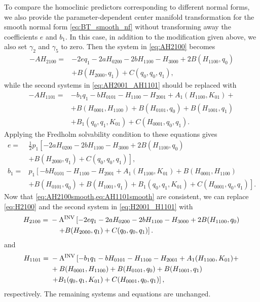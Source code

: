 To compare the homoclinic predictors corresponding to different normal forms, we also
provide the parameter-dependent center manifold transformation for the smooth
normal form \cref{eq:BT_smooth_nf} without transforming away the coefficients
$e$ and $b_1$. In this case, in addition to the modification given above, we also set
$\gamma_2$ and $\gamma_5$ to zero. Then the system in \cref{eq:AH2100} becomes
\begin{equation}
\label{eq:AH2100smooth}
\begin{aligned}
-A H_{2100} ={}& - 2 e q_1 -2 a H_{0200}-2 b H_{1100}-H_{3000} + 2 B(H_{1100},q_0) \\
				& + B(H_{2000},q_1) + C(q_0,q_0,q_1),
\end{aligned}
\end{equation}
while the second systems in \cref{eq:AH2001_AH1101} should be replaced with
\begin{equation}
\label{eq:AH1101smooth}
\begin{aligned}
-AH_{1101} ={}& -b_1 q_1 -b H_{0101} - H_{1100} - H_{2001} + A_1(H_{1100},K_{01}) + \\
              &+ B(H_{0001},H_{1100}) + B(H_{0101},q_0) + B(H_{1001},q_1) \\
              &+ B_1(q_0,q_1,K_{01}) + C(H_{0001},q_0,q_1).
\end{aligned}
\end{equation}
Applying the Fredholm solvability condition to these equations gives
\begin{equation*}
\begin{aligned}
e ={}& \frac{1}{2} p_1 \left[ -2 a H_{0200}-2 b H_{1100}-H_{3000} + 2 B(H_{1100},q_0) \right.  \\
     & \left. + B(H_{2000},q_1) + C(q_0,q_0,q_1) \right], \\ 
b_1 ={}& p_1 \left[ -b H_{0101} - H_{1100} - H_{2001} + A_1(H_{1100},K_{01}) + B(H_{0001},H_{1100})  \right. \\
      & \left. + B(H_{0101},q_0) + B(H_{1001},q_1) + B_1(q_0,q_1,K_{01}) + C(H_{0001},q_0,q_1) \right].
\end{aligned}
\end{equation*}
Now that \cref{eq:AH2100smooth,eq:AH1101smooth} are consistent, we can replace
\cref{eq:H2100} and the second system in \cref{eq:H2001_H1101} with
\begin{align*}
	H_{2100} ={} & -\operatorname{A^{\text{INV}}} \left[ -2e q_1 - 2 a H_{0200}-2 b H_{1100}-H_{3000} + 2 B(H_{1100},q_0) \right. \\
	             & \left. \quad + B(H_{2000},q_1) + C(q_0,q_0,q_1) \right]. \nonumber
\end{align*}
and
\begin{equation*}
\begin{aligned}
H_{1101} ={}& -\operatorname{A^{\text{INV}}} \left[ -b_1 q_1 -b H_{0101} - H_{1100} - H_{2001} + A_1(H_{1100},K_{01}) + \right. \\
				& + B(H_{0001},H_{1100}) + B(H_{0101},q_0) + B(H_{1001},q_1) \\
				& \left. + B_1(q_0,q_1,K_{01}) + C(H_{0001},q_0,q_1) \right],
\end{aligned}
\end{equation*}
respectively. The remaining systems and equations are unchanged.

